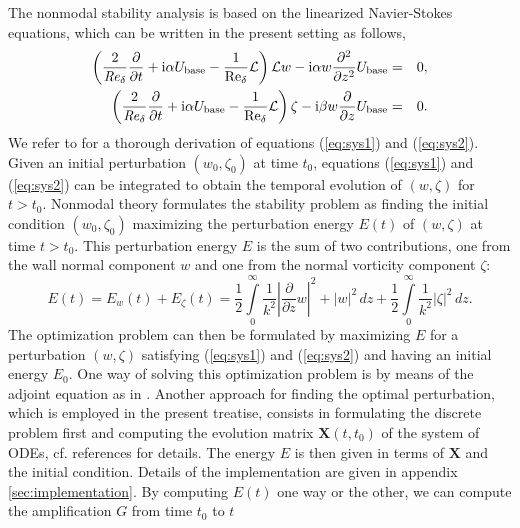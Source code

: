 \documentclass{jfm}
\newcommand\be{\begin{equation}}
\newcommand\ee{\end{equation}}
\newcommand\bea{\begin{eqnarray}}
\newcommand\eea{\end{eqnarray}}
\newcommand\base{{\rm base}}
\newcommand\Rey{\mbox{\textit{Re}}}  %
\newcommand\dz{ \frac{\partial}{\partial z}}
\newcommand\dzdz{ \frac{\partial^2}{\partial z^2}}
\begin{document}
The nonmodal stability analysis is based on the linearized Navier-Stokes
equations, which can be written in the present setting as follows,
\bea
\left( \frac{2}{\Rey_\delta}\frac{\partial}{\partial t} + {\rm i} \alpha U_\base - \frac{1}{\rm Re_\delta} \mathcal{L}
\right) \mathcal{L} w
- {\rm i} \alpha w \dzdz U_\base  &=& 0, \label{eq:sys1} \\
\left( \frac{2}{\Rey_\delta} \frac{\partial}{\partial t} + {\rm i} \alpha U_\base  - \frac{1}{\rm Re_\delta} \mathcal{L}
\right) \zeta - {\rm i} \beta w \dz U_\base 
&=& 0. \label{eq:sys2}
\eea
We refer to \citet{SchmidHenningson2001,Schmid2007} for a thorough derivation
of equations (\ref{eq:sys1}) and (\ref{eq:sys2}).
Given an initial
perturbation $ (w_0,\zeta_0 ) $ at time $ t_0 $, equations 
(\ref{eq:sys1}) and (\ref{eq:sys2}) can be integrated to
obtain the temporal evolution of $ (w,\zeta)$ for $ t > t_0 $.
Nonmodal theory formulates the stability problem as finding
the initial condition $(w_0,\zeta_0 ) $ maximizing the perturbation
energy $ E(t) $ of $ (w,\zeta) $ at time $ t > t_0 $. 
This perturbation energy $ E $ is the sum
of two contributions, one from the wall normal component $ w $ 
and one from the normal vorticity component $ \zeta$:
\be
E(t) = E_w(t) + E_\zeta(t) = 
\frac{1}{2} \int \limits_0^\infty \frac{1}{k^2} \left| \dz w \right|^2 + \left| w \right|^2 \, dz 
+ \frac{1}{2} \int \limits_0^\infty \frac{1}{k^2} \left| \zeta \right|^2 \, dz.
\label{eq:energyNonmodal}
\ee
The optimization problem can then be formulated by maximizing $ E$ for
a perturbation $ (w,\zeta) $ satisfying (\ref{eq:sys1}) and (\ref{eq:sys2})
and having an initial energy $ E_0 $. One way of solving this
optimization problem is 
by means of the adjoint equation as in \citet{LuchiniBottaro2014}. Another
approach for finding the optimal perturbation, which is employed in
the present treatise, consists in formulating
the discrete problem first and computing the evolution matrix $ \mathbf{X}(t,t_0) $ of the
system of ODEs, cf. references \citet{TrefethenTrefethenReddyDriscoll1993,SchmidHenningson2001,Schmid2007} for details. The energy $ E $ is then
given in terms of $ \mathbf{X} $ and the initial condition. Details of
the implementation are given in appendix \ref{sec:implementation}. 
By computing $ E(t) $ one way or the other, we can compute
the amplification $ G $ from time $ t_0 $ to $ t $ 
\end{document}
